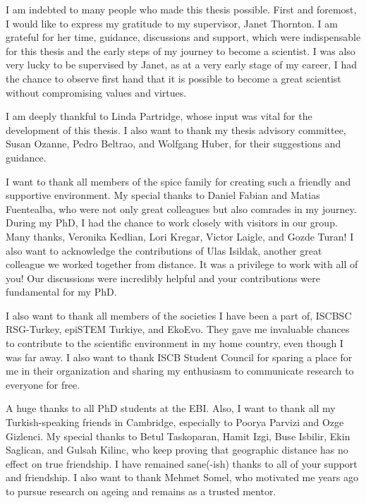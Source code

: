 \documentclass[12pt,twoside]{unicam}
\begin{document}
  \begin{acknowledgements}
    I am indebted to many people who made this thesis possible. First and foremost, I would like to express my gratitude to my supervisor, Janet Thornton. I am grateful for her time, guidance, discussions and support, which were indispensable for this thesis and the early steps of my journey to become a scientist. I was also very lucky to be supervised by Janet, as at a very early stage of my career, I had the chance to observe first hand that it is possible to become a great scientist without compromising values and virtues.

    \vspace{0.3cm}

    I am deeply thankful to Linda Partridge, whose input was vital for the development of this thesis. I also want to thank my thesis advisory committee, Susan Ozanne, Pedro Beltrao, and Wolfgang Huber, for their suggestions and guidance.

    \vspace{0.3cm}

    I want to thank all members of the spice family for creating such a friendly and supportive environment. My special thanks to Daniel Fabian and Matias Fuentealba, who were not only great colleagues but also comrades in my journey. During my PhD, I had the chance to work closely with visitors in our group. Many thanks, Veronika Kedlian, Lori Kregar, Victor Laigle, and Gozde Turan! I also want to acknowledge the contributions of Ulas Isildak, another great colleague we worked together from distance. It was a privilege to work with all of you! Our discussions were incredibly helpful and your contributions were fundamental for my PhD.

    \vspace{0.3cm}

    I also want to thank all members of the societies I have been a part of, ISCBSC RSG-Turkey, epiSTEM Turkiye, and EkoEvo. They gave me invaluable chances to contribute to the scientific environment in my home country, even though I was far away. I also want to thank ISCB Student Council for sparing a place for me in their organization and sharing my enthusiasm to communicate research to everyone for free.

    \vspace{0.3cm}

    A huge thanks to all PhD students at the EBI. Also, I want to thank all my Turkish-speaking friends in Cambridge, especially to Poorya Parvizi and Ozge Gizlenci. My special thanks to Betul Taskoparan, Hamit Izgi, Buse Isbilir, Ekin Saglican, and Gulsah Kilinc, who keep proving that geographic distance has no effect on true friendship. I have remained sane(-ish) thanks to all of your support and friendship. I also want to thank Mehmet Somel, who motivated me years ago to pursue research on ageing and remains as a trusted mentor.


\end{acknowledgements}
\end{document}
